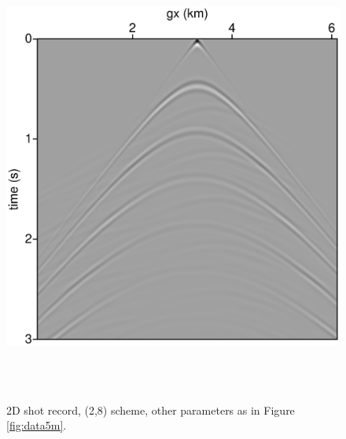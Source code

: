 \begin{figure}
\includegraphics[height=15cm,width=15cm]{./Fig/fig6.ps}
\caption{2D shot record, (2,8) scheme, other
  parameters as in Figure \ref{fig:data5m}.}
\label{fig:data5m8k}
\end{figure}

